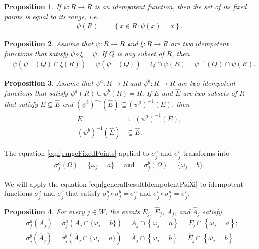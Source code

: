 \documentclass[reqno]{amsart}
\newtheorem{proposition}{Proposition}
\begin{document}
\begin{proposition}\label{prop|IdempotentFixedPoints} If $\psi:R\to R$ is an idempotent function, then the set of its fixed points is equal to its range, i.e. \begin{align}
\psi(R)&=\left\{x\in R: \psi(x)=x\right\}.
\label{eqn|rangeFixedPoints}
\end{align}\end{proposition}
 


\begin{proposition}\label{prop|IdempotentPsiXi} Assume that $\psi:R\to R$ and $\xi: R\to R$ are two idempotent functions that satisfy $\psi\circ \xi =\psi$. If $Q$ is any subset of $R$, then 
\begin{align}
&\psi\left(\psi^{-1}(Q)\cap \xi(R)\right)=\psi\left(\psi^{-1}(Q)\right)=Q\cap \psi(R)  =\psi^{-1}(Q)\cap \psi(R). \label{eqn|generalResultIdempotentPsiXi}
\end{align}
\end{proposition}
 
 \begin{proposition}\label{prop|IdempotentPsiAPsiB} Assume that $\psi^a:R\to R$ and $\psi^b: R\to R$ are two idempotent functions that satisfy $\psi^a(R)\cup \psi^b(R)=R$. 
  If  $E$ and $\hat E$ are two subsets of $R$ that  satisfy $E\subseteq \hat E$ and  $(\psi^b)^{-1}(\hat E)\subseteq (\psi^a)^{-1}(E)$, then 
 \begin{align} E  &\subseteq  (\psi^a)^{-1}(E) , \label{eqn|InclusionAEGen}\\ 
  (\psi^b)^{-1}(\hat E)&\subseteq  \hat E.  \label{eqn|InclusionHatAEGeni} 
  \end{align}
 \end{proposition}
 
The equation \eqref{eqn|rangeFixedPoints} applied to $\sigma_j^a$ and $\sigma_j^b$ transforms into \begin{align}
\sigma_j^a\left(\Omega\right)=\{\omega_j=a\}\quad\text{ and }\quad 
\sigma_j^b\left(\Omega\right)=\{\omega_j=b\}.
\label{eqn|fixedPointsSigmaJAB}
\end{align}

We will apply the equation \eqref{eqn|generalResultIdempotentPsiXi}
 to idempotent functions $\sigma_j^a$ and $\sigma_j^b$ that satisfy $\sigma_j^a\circ\sigma_j^b=\sigma_j^a$ and $\sigma_j^b\circ\sigma_j^a=\sigma_j^b$. 

\begin{proposition} For every $j\in W$, the events $E_j$, $\hat E_j$, $A_j$, and $\hat A_j$ satisfy 
\begin{align}
&\sigma_j^a(A_j)=\sigma_j^a(A_j\cap\{\omega_j=b\}) 
=A_j\cap \left\{\omega_j=a\right\} 
=E_j\cap \left\{\omega_j=a\right\}; \label{eqn:AEinclusion}\\
&\sigma_j^b(\hat A_j) = \sigma_j^b(\hat A_j\cap\{\omega_j=a\})  
=\hat A_j\cap \left\{\omega_j=b\right\} 
=\hat E_j\cap \left\{\omega_j=b\right\}. \label{eqn:HatAEinclusion}
\end{align}

\end{proposition}
\end{document}
